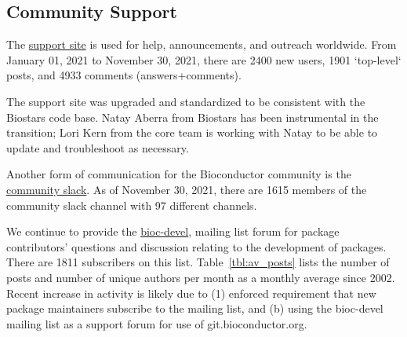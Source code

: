 \documentclass[letterpaper]{article}
\begin{document}
\subsection{Community Support}

The \Bioconductor{} \href{https://support.bioconductor.org}{support
  site} is used for help, announcements, and outreach worldwide. From January
01, 2021 to November 30, 2021, there are 2400 new users, 1901 `top-level` posts,
and 4933 comments (answers+comments). 

The support site was upgraded and standardized to be consistent with the
Biostars code base. Natay Aberra from Biostars has been instrumental in the
transition; Lori Kern from the core team is working with Natay to be able to
update and troubleshoot as necessary. 


Another form of communication for the Bioconductor community is the \Bioconductor{}
\href{https://community-bioc.slack.com}{community slack}. As of November 30,
2021, there are 1615 members of the community slack channel with 97 different channels.


We continue to provide the
\href{http://www.stat.math.ethz.ch/mailman/listinfo/bioc-devel}{bioc-devel},
mailing list forum for package contributors' questions and discussion
relating to the development of \Bioconductor{} packages. There are
1811 subscribers on this list. Table~\ref{tbl:av_posts} lists the number of
posts and number of unique authors per month as a monthly average since
2002. Recent increase in activity is likely due to (1) enforced requirement that
new package maintainers subscribe to the mailing list, and (b) using
the bioc-devel mailing list as a support forum for use of
git.bioconductor.org. 
\end{document}
